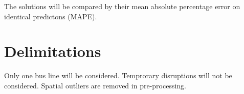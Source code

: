 The solutions will be compared by their mean absolute percentage error on identical predictons (MAPE).

\section{Delimitations}
\label{sec:delimitations}

Only one bus line will be considered. Temprorary disruptions will not be considered. Spatial outliers are removed in pre-processing.




